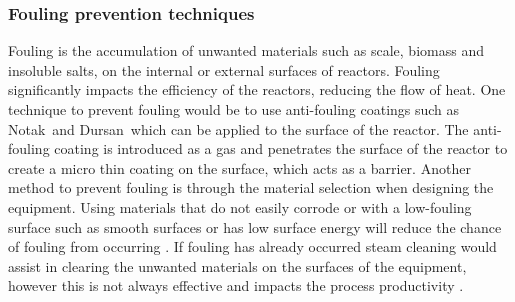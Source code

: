 \subsubsection{Fouling prevention techniques}
Fouling is the accumulation of unwanted materials such as scale, biomass and insoluble salts, on the internal or external surfaces of reactors. Fouling significantly impacts the efficiency of the reactors, reducing the flow of heat. One technique to prevent fouling would be to use anti-fouling coatings such as Notak\texttrademark\ and Dursan\textsuperscript \textregistered\  which can be applied to the surface of the reactor. The anti-fouling coating is introduced as a gas and penetrates the surface of the reactor to create a micro thin coating on the surface, which acts as a barrier. Another method to prevent fouling is through the material selection when designing the equipment. Using materials that do not easily corrode or with a low-fouling surface such as smooth surfaces or has low surface energy will reduce the chance of fouling from occurring \cite{Ibrahim12}. If fouling has already occurred steam cleaning would assist in clearing the unwanted materials on the surfaces of the equipment, however this is not always effective and impacts the process productivity \cite{KillcrossMartin2012CPT}.